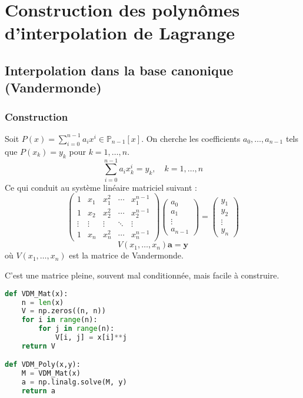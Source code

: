\documentclass[oneside]{book}
\begin{document}
\section{Construction des polynômes d'interpolation de Lagrange}

\subsection{Interpolation dans la base canonique (Vandermonde)}

\subsubsection{Construction}

Soit $P(x) = \sum_{i=0}^{n-1} a_i x^i \in \mathbb{P}_{n-1}[x]$.
On cherche les coefficients $a_0, \dots, a_{n-1}$ tels que $P(x_k) = y_k$ pour $k=1, \dots, n$.
\[
\sum_{i=0}^{n-1} a_i x_k^i = y_k, \quad k=1, \dots, n
\]
Ce qui conduit au système linéaire matriciel suivant :
\[
\begin{pmatrix}
1 & x_1 & x_1^2 & \cdots & x_1^{n-1} \\
1 & x_2 & x_2^2 & \cdots & x_2^{n-1} \\
\vdots & \vdots & \vdots & \ddots & \vdots \\
1 & x_n & x_n^2 & \cdots & x_n^{n-1}
\end{pmatrix}
\begin{pmatrix} a_0 \\ a_1 \\ \vdots \\ a_{n-1} \end{pmatrix} = \begin{pmatrix} y_1 \\ y_2 \\ \vdots \\ y_n \end{pmatrix}
\]
\[
V(x_1, \dots, x_n) \mathbf{a} = \mathbf{y}
\]
où $V(x_1, \dots, x_n)$ est la matrice de Vandermonde.

C'est une matrice pleine, souvent mal conditionnée, mais facile à construire.

\begin{lstlisting}[language=Python]
def VDM_Mat(x):
    n = len(x)
    V = np.zeros((n, n))
    for i in range(n):
        for j in range(n):
            V[i, j] = x[i]**j
    return V

def VDM_Poly(x,y):
    M = VDM_Mat(x)
    a = np.linalg.solve(M, y)
    return a
\end{lstlisting}
\end{document}
